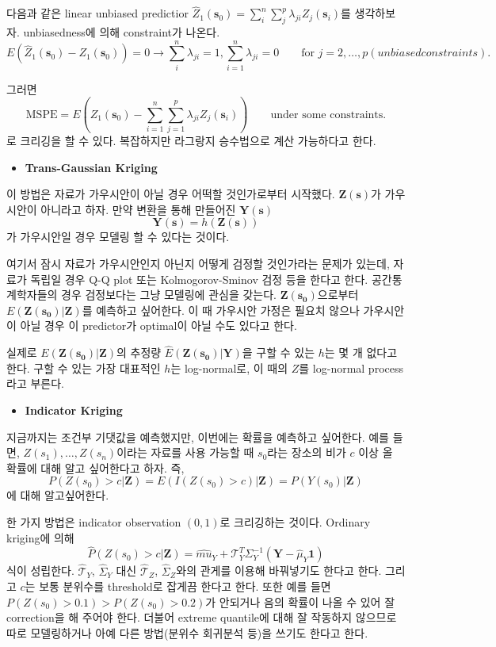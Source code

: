 \documentclass[b5paper,]{scrbook}
\providecommand{\tightlist}{%
  \setlength{\itemsep}{0pt}\setlength{\parskip}{0pt}}
\theoremstyle{plain}
\theoremstyle{definition}
\numberwithin{equation}{section}
\begin{document}
다음과 같은 linear unbiased predictior \(\hat{Z}_{1}(\mathbf{s}_{0})=\sum_{i}^{n}\sum_{j}^{p}\lambda_{ji}Z_{j}(\mathbf{s}_{i})\)를 생각하보자. unbiasedness에 의해 constraint가 나온다.
\[E(\hat{Z}_{1}(\mathbf{s}_{0})-Z_{1}(\mathbf{s}_{0}))=0 \rightarrow \sum_{i}^{n}\lambda_{ji}=1, \sum_{i=1}^{n}\lambda_{ji}=0 \qquad \text{for } j=2,\ldots, p (unbiased constraints).\]

그러면
\[\text{MSPE}=E(Z_{1}(\mathbf{s}_{0})-\sum_{i=1}^{n}\sum_{j=1}^{p}\lambda_{ji}Z_{j}(\mathbf{s}_{i})) \qquad{\text{under some constraints.}}\]
로 크리깅을 할 수 있다. 복잡하지만 라그랑지 승수법으로 계산 가능하다고 한다.

\begin{itemize}
\tightlist
\item
  \textbf{Trans-Gaussian Kriging}
\end{itemize}

이 방법은 자료가 가우시안이 아닐 경우 어떡할 것인가로부터 시작했다. \(\mathbf{Z}(\mathbf{s})\)가 가우시안이 아니라고 하자. 만약 변환을 통해 만들어진 \(\mathbf{Y}(\mathbf{s})\)
\[\mathbf{Y}(\mathbf{s})=h(\mathbf{Z}(\mathbf{s}))\]
가 가우시안일 경우 모델링 할 수 있다는 것이다.

여기서 잠시 자료가 가우시안인지 아닌지 어떻게 검정할 것인가라는 문제가 있는데, 자료가 독립일 경우 Q-Q plot 또는 Kolmogorov-Sminov 검정 등을 한다고 한다. 공간통계학자들의 경우 검정보다는 그냥 모델링에 관심을 갖는다. \(\mathbf{Z}(\mathbf{s_{0}})\)으로부터 \(E(\mathbf{Z}(\mathbf{s_{0}})|\mathbf{Z})\)를 예측하고 싶어한다. 이 때 가우시안 가정은 필요치 않으나 가우시안이 아닐 경우 이 predictor가 optimal이 아닐 수도 있다고 한다.

실제로 \(E(\mathbf{Z}(\mathbf{s_{0}})|\mathbf{Z})\)의 추정량 \(\hat{E}(\mathbf{Z}(\mathbf{s_{0}})|\mathbf{Y})\)을 구할 수 있는 \(h\)는 몇 개 없다고 한다. 구할 수 있는 가장 대표적인 \(h\)는 log-normal로, 이 때의 \(Z\)를 log-normal process라고 부른다.

\begin{itemize}
\tightlist
\item
  \textbf{Indicator Kriging}
\end{itemize}

지금까지는 조건부 기댓값을 예측했지만, 이번에는 확률을 예측하고 싶어한다. 예를 들면, \(Z(s_{1}), \ldots , Z(s_{n})\)이라는 자료를 사용 가능할 때 \(s_{0}\)라는 장소의 비가 \(c\) 이상 올 확률에 대해 알고 싶어한다고 하자. 즉,
\[P(Z(s_{0})>c |\mathbf{Z})=E(I(Z(s_{0})>c)|\mathbf{Z})=P(Y(s_{0})|\mathbf{Z})\]
에 대해 알고싶어한다.

한 가지 방법은 indicator observation \((0,1)\)로 크리깅하는 것이다. Ordinary kriging에 의해
\[\hat{P}(Z(s_{0})>c|\mathbf{Z})=\hat{mu}_{Y}+\mathcal{T}_{Y}^{T}\Sigma_{Y}^{-1}(\mathbf{Y}-\hat{\mu}_{Y}\mathbf{1})\]
식이 성립한다. \(\hat{\mathcal{T}}_{Y}\), \(\hat{\Sigma}_{Y}\) 대신 \(\hat{\mathcal{T}}_{Z}\), \(\hat{\Sigma}_{Z}\)와의 관게를 이용해 바꿔넣기도 한다고 한다. 그리고 \(c\)는 보통 분위수를 threshold로 잡게끔 한다고 한다. 또한 예를 들면 \(P(Z(s_{0})>0.1)>P(Z(s_{0})>0.2)\)가 안되거나 음의 확률이 나올 수 있어 잘 correction을 해 주어야 한다. 더불어 extreme quantile에 대해 잘 작동하지 않으므로 따로 모델링하거나 아예 다른 방법(분위수 회귀분석 등)을 쓰기도 한다고 한다.
\end{document}
